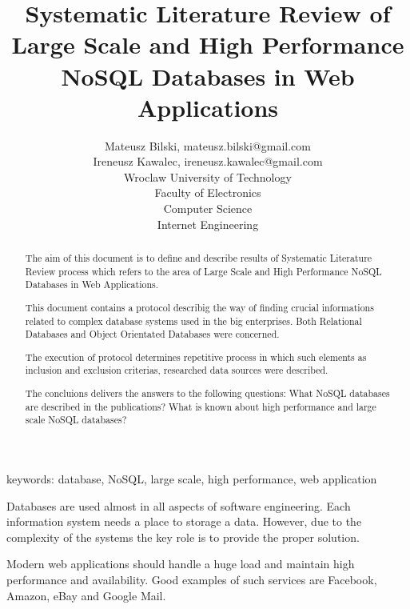 \documentclass[times, 10pt,twocolumn]{article}
\begin{document}
  

\title{ Systematic Literature Review
       of Large Scale and High Performance NoSQL Databases in Web Applications}
\author{Mateusz Bilski, mateusz.bilski@gmail.com \\ Ireneusz Kawalec, ireneusz.kawalec@gmail.com \\ 
Wroclaw University of Technology\\ Faculty of Electronics \\ Computer Science \\ Internet Engineering  \\  
}

\maketitle
\thispagestyle{empty} 

\begin{abstract}  

The aim of this document is to define and describe results of Systematic Literature Review process which 
refers to the area of Large Scale and High Performance NoSQL Databases in Web Applications.

This document contains a protocol describig the way of finding crucial informations related to complex database systems used in the big enterprises.   
Both Relational Databases and Object Orientated Databases were concerned.

The execution of protocol determines repetitive process in which such elements as  
inclusion and exclusion criterias, researched data sources were described. 

The concluions delivers the answers to the following questions:
What NoSQL databases are described in the publications? What is known about high performance and large scale NoSQL databases?

\end{abstract} 

keywords: database, NoSQL, large scale, high performance, web application


Databases are used almost in all aspects of software engineering. Each 
information system needs a place to storage a data. However, due to the complexity of the systems 
the key role is to provide the proper solution.

Modern web applications should handle a huge load and maintain high performance and
availability. Good examples of such services are Facebook, Amazon, eBay and Google Mail.
\end{document}
